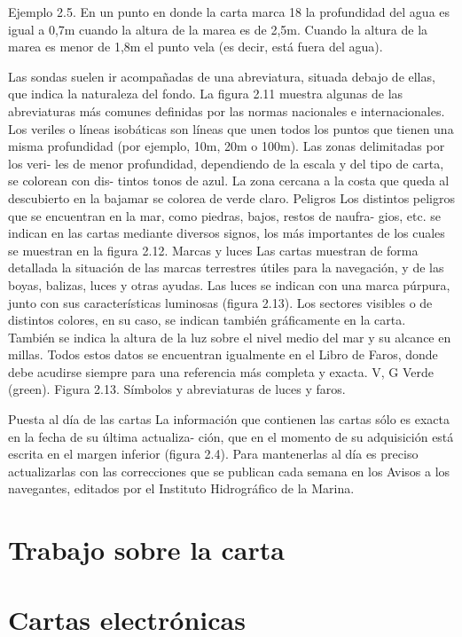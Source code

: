 Ejemplo 2.5. En un punto en donde la carta marca 18 la profundidad del agua es igual a 0,7m cuando 
la altura de la marea es de 2,5m. Cuando la altura de la marea es menor de 1,8m el punto vela (es 
decir, está fuera del agua). 


Las sondas suelen ir acompañadas de una
abreviatura, situada debajo de ellas, que
indica la naturaleza del fondo. La figura 2.11
muestra algunas de las abreviaturas más
comunes definidas por las normas nacionales
e internacionales. 
Los veriles o líneas isobáticas son líneas
que unen todos los puntos que tienen una
misma profundidad (por ejemplo, 10m, 20m
o 100m). Las zonas delimitadas por los veri-
les de menor profundidad, dependiendo de la
escala y del tipo de carta, se colorean con dis-
tintos tonos de azul. La zona cercana a la
costa que queda al descubierto en la bajamar
se colorea de verde claro. 
 Peligros 
Los distintos peligros que se encuentran en la
mar, como piedras, bajos, restos de naufra-
gios, etc. se indican en las cartas mediante
diversos signos, los más importantes de los
cuales se muestran en la figura 2.12. 
Marcas y luces 
Las cartas muestran de forma detallada la
situación de las marcas terrestres útiles para la
navegación, y de las boyas, balizas, luces y
otras ayudas. Las luces se indican con una
marca púrpura, junto con sus características
luminosas (figura 2.13). Los sectores visibles
o de distintos colores, en su caso, se indican
también gráficamente en la carta. También se
indica la altura de la luz sobre el nivel medio
del mar y su alcance en millas. Todos estos
datos se encuentran igualmente en el Libro de 
Faros, donde debe acudirse siempre para una 
referencia más completa y exacta. 
V, G Verde (green). 
Figura 2.13. Símbolos y abreviaturas 
de luces y faros.

Puesta al día de las cartas 
La información que contienen las cartas sólo es exacta en la fecha de su última actualiza- 
ción, que en el momento de su adquisición está escrita en el margen inferior (figura 2.4). 
Para mantenerlas al día es preciso actualizarlas con las correcciones que se publican cada 
semana en los Avisos a los navegantes, editados por el Instituto Hidrográfico de la 
Marina. 

\section{Trabajo sobre la carta}


\section{Cartas electrónicas}

